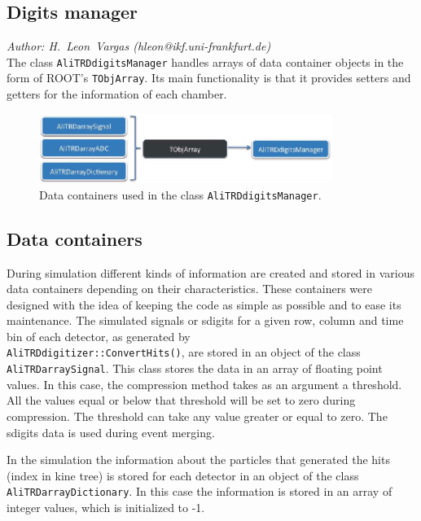 \documentclass{alicetdr}
\begin{document}
\subsection{Digits manager}
\label{DIGITS:manager}
%
{\it Author: H.~Leon~Vargas (hleon@ikf.uni-frankfurt.de)}
\smallskip
\\
%
The class {\tt AliTRDdigitsManager} handles arrays of data container 
objects in the form of ROOT's {\tt TObjArray}.  Its main functionality 
is that it provides setters and getters for the information of each chamber.
%
\begin{figure}[htb]
\begin{center}
\includegraphics[width=0.85\textwidth]{plots/digitsmanager_containers.eps}
\end{center}
\caption{
Data containers used in the class {\tt AliTRDdigitsManager}.
}
\label{FIG_DIG:manager}
\end{figure}
%
\subsection{Data containers}
\label{DIGITS:containers}
%
During simulation different kinds of information are created and stored 
in various data containers depending on their characteristics. 
These containers were designed with the idea of keeping the code as 
simple as possible and to ease its maintenance. 
The simulated signals or sdigits for a given row, column and time bin 
of each detector, as generated by \\ {\tt AliTRDdigitizer::ConvertHits()}, 
are stored in an object of the class {\tt AliTRDarraySignal}.   This 
class stores the data in an array of floating point values.  In this 
case, the compression method takes as an argument a threshold.  All the 
values equal or below that threshold will be set to zero during
compression. The threshold can take any value greater or equal to zero.
The sdigits data is used during event merging.

In the simulation the information about the particles that generated the
hits (index in kine tree) is stored for each detector in an object
of the class {\tt AliTRDarrayDictionary}. In this case the information 
is stored in an array of integer values, which is initialized to -1.
 
\end{document}
